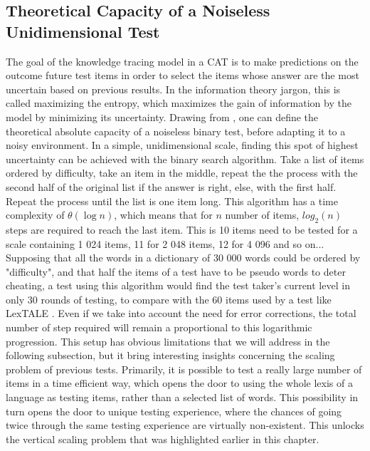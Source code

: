     \subsection{Theoretical Capacity of a Noiseless Unidimensional Test}
The goal of the knowledge tracing model in a CAT is to make predictions on the outcome future test items in order to select the items whose answer are the most uncertain based on previous results. In the information theory jargon, this is called maximizing the entropy, which maximizes the gain of information by the model by minimizing its uncertainty. Drawing from \textcite{shannon_mathematical_1948}, one can define the theoretical absolute capacity of a noiseless binary test, before adapting it to a noisy environment. In a simple, unidimensional scale, finding this spot of highest uncertainty can be achieved with the binary search algorithm. Take a list of items ordered by difficulty, take an item in the middle,  repeat the the process with the second half of the original list if the answer is right, else, with the first half. Repeat the process until the list is one item long. This algorithm has a time complexity of $\theta(\log{n})$, which means that for $n$ number of items, $log_2(n)$ steps are required to reach the last item. This is 10 items need to be tested for a scale containing 1 024 items, 11 for 2 048 items, 12 for 4 096 and so on...\\
Supposing that all the words in a dictionary of 30 000 words could be ordered by "difficulty", and that half the items of a test have to be pseudo words to deter cheating, a test using this algorithm would find the test taker's current level in only 30 rounds of testing, to compare with the 60 items used by a test like LexTALE \parencite{lemhofer_introducing_2012}. Even if we take into account the need for error corrections, the total number of step required will remain a proportional to this logarithmic progression. This setup has obvious limitations that we will address in the following subsection, but it bring interesting insights concerning the scaling problem of previous tests. Primarily, it is possible to test a really large number of items in a time efficient way, which opens the door to using the whole lexis of a language as testing items, rather than a selected list of words. This possibility in turn opens the door to unique testing experience, where the chances of going twice through the same testing experience are virtually non-existent. This unlocks the vertical scaling problem that was highlighted earlier in this chapter.

